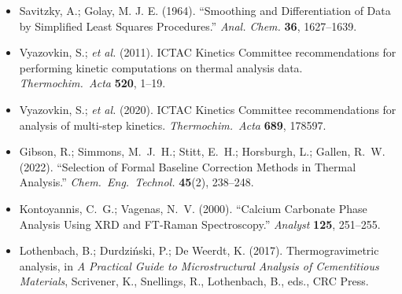 \documentclass[11pt]{article}
\begin{document}
\begin{itemize}[leftmargin=*, label={}]
  \item Savitzky, A.; Golay, M. J. E. (1964). ``Smoothing and
        Differentiation of Data by Simplified Least Squares
        Procedures.'' \emph{Anal. Chem.} \textbf{36}, 1627--1639.
  \item Vyazovkin, S.; \emph{et al.} (2011). ICTAC Kinetics Committee
        recommendations for performing kinetic computations on thermal
        analysis data. \emph{Thermochim.\ Acta} \textbf{520}, 1--19.
  \item Vyazovkin, S.; \emph{et al.} (2020). ICTAC Kinetics Committee
        recommendations for analysis of multi-step kinetics.
        \emph{Thermochim.\ Acta} \textbf{689}, 178597.
  \item Gibson, R.; Simmons, M.~J.~H.; Stitt, E.~H.; Horsburgh, L.;
        Gallen, R.~W. (2022). ``Selection of Formal Baseline
        Correction Methods in Thermal Analysis.''
        \emph{Chem.\ Eng.\ Technol.} \textbf{45}(2), 238--248.
  \item Kontoyannis, C.~G.; Vagenas, N.~V. (2000). ``Calcium Carbonate
        Phase Analysis Using XRD and FT-Raman Spectroscopy.''
        \emph{Analyst} \textbf{125}, 251--255.
  \item Lothenbach, B.; Durdzi\'nski, P.; De Weerdt, K. (2017).
        Thermogravimetric analysis, in \emph{A Practical Guide to
        Microstructural Analysis of Cementitious Materials},
        Scrivener, K., Snellings, R., Lothenbach, B., eds., CRC Press.
\end{itemize}
\end{document}
